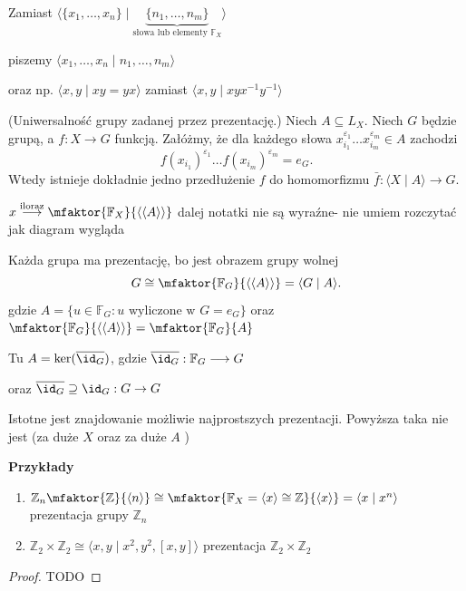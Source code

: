 Zamiast $\langle \{x_1,\ldots,x_{n}\} \mid \underbrace{\{n_1,\ldots, n_{m}\}}_{\text{słowa lub elementy }\mathbb{F}_{X}} \rangle $
 
piszemy $\langle x_1,\ldots,x_{n} \mid n_1,\ldots,n_{m} \rangle $ 

oraz np. $\langle x,y \mid xy = yx \rangle $ zamiast $\langle x,y \mid xyx^{-1}y^{-1} \rangle $

\begin{fact}

	(Uniwersalność grupy zadanej przez prezentację.) Niech $A \subseteq L_{X}$. Niech $G$ będzie grupą, a $f: X \to G$ funkcją. Załóżmy, że dla każdego słowa $x_{i_1}^{\varepsilon_1} \dots x_{i_m}^{\varepsilon_m} \in A$ zachodzi
\[
f(x_{i_1})^{\varepsilon_1} \dots f(x_{i_m})^{\varepsilon_m} = e_G.
\]
Wtedy istnieje dokładnie jedno przedłużenie $f$ do homomorfizmu $\bar{f}: \langle X \mid A \rangle \to G$.

$x \overset{\text{iloraz}}{\longrightarrow } \mfaktor{\mathbb{F}_{X}}{\langle \langle A \rangle  \rangle } $ dalej notatki nie są wyraźne- nie umiem rozczytać jak diagram wygląda
\end{fact}
\begin{remark}
	Każda grupa ma prezentację, bo jest obrazem grupy wolnej
	\[
	G \cong \mfaktor{\mathbb{F}_{G}}{\langle \langle A \rangle  \rangle } = \langle G \mid A \rangle 
	.\] 
	gdzie $A = \{u \in \mathbb{F}_{G}: u \text{ wyliczone w } G = e_{G}\} $ oraz $\mfaktor{\mathbb{F}_{G}}{\langle \langle A \rangle  \rangle } = \mfaktor{\mathbb{F}_{G}}{A} $

	Tu $A = \ker(\overline{\id_{G}}) $, gdzie $\overline{\id_{G}}: \mathbb{F}_{G} \longrightarrow G$ 

	oraz $\overline{\id_{G}} \supseteq \id_{G}: G \to G$
\end{remark} 

\vspace{1em}

Istotne jest znajdowanie możliwie najprostszych prezentacji. Powyższa taka nie jest (za duże $X$ oraz za duże $A$ )

\noindent \textbf{Przykłady} 
\begin{enumerate}[label=\arabic*)]
	\item $\mathbb{Z}_{n} \mfaktor{\mathbb{Z}}{\langle n \rangle } \cong \mfaktor{\mathbb{F}_{X} = \langle x \rangle \cong \mathbb{Z}}{\langle x \rangle } = \langle x \mid x^{n} \rangle  $ prezentacja grupy $\mathbb{Z}_{n}$
	\item $\mathbb{Z}_{2} \times \mathbb{Z}_{2} \cong \langle x,y \mid x^2,y^2,\left[ x,y \right]  \rangle $ prezentacja $\mathbb{Z}_{2}\times \mathbb{Z}_{2}$
\end{enumerate}
\begin{proof}
	TODO
\end{proof} 
